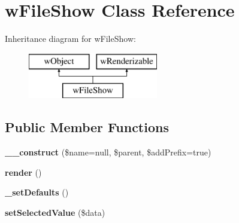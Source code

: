 \hypertarget{classwFileShow}{
\section{wFileShow Class Reference}
\label{classwFileShow}
}
Inheritance diagram for wFileShow:\begin{figure}[H]
\begin{center}
\leavevmode
\includegraphics[height=2.000000cm]{classwFileShow}
\end{center}
\end{figure}
\subsection*{Public Member Functions}
\begin{DoxyCompactItemize}
\item 
\hypertarget{classwFileShow_ac9714f8ec7a874634dc1ef287c071ef0}{
{\bfseries \_\-\_\-construct} (\$name=null, \$parent, \$addPrefix=true)}
\label{classwFileShow_ac9714f8ec7a874634dc1ef287c071ef0}

\item 
\hypertarget{classwFileShow_ad22a26cbe218296e36fe1c48c32f05b9}{
{\bfseries render} ()}
\label{classwFileShow_ad22a26cbe218296e36fe1c48c32f05b9}

\item 
\hypertarget{classwFileShow_af4331bffca885f8b30d02013a7d8510a}{
{\bfseries \_\-setDefaults} ()}
\label{classwFileShow_af4331bffca885f8b30d02013a7d8510a}

\item 
\hypertarget{classwFileShow_a9f157babb9bd0c5b88670ed89a3531d6}{
{\bfseries setSelectedValue} (\$data)}
\label{classwFileShow_a9f157babb9bd0c5b88670ed89a3531d6}

\end{DoxyCompactItemize}
